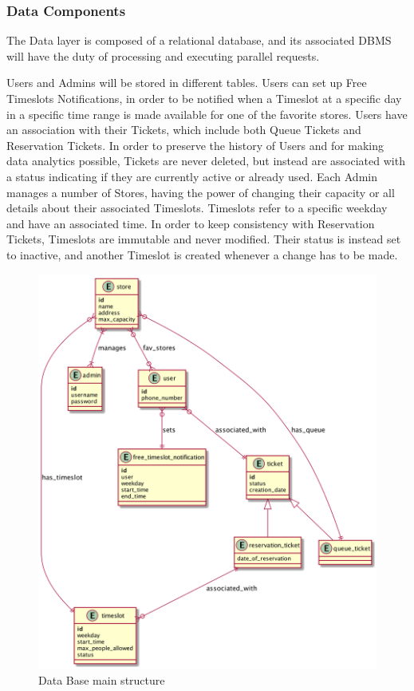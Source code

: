 \subsubsection{Data Components}
The Data layer is composed of a relational database, and its associated DBMS will have the duty of processing and executing parallel requests.

Users and Admins will be stored in different tables.
Users can set up Free Timeslots Notifications, in order to be notified when a Timeslot at a specific day in a specific time range is made available for one of the favorite stores.
Users have an association with their Tickets, which include both Queue Tickets and Reservation Tickets.
In order to preserve the history of Users and for making data analytics possible, Tickets are never deleted, but instead are associated with a status indicating if they are currently active or already used.
Each Admin manages a number of Stores, having the power of changing their capacity or all details about their associated Timeslots.
Timeslots refer to a specific weekday and have an associated time.
In order to keep consistency with Reservation Tickets, Timeslots are immutable and never modified. Their status is instead set to inactive, and another Timeslot is created whenever a change has to be made.


\begin{figure}[H]
    \includegraphics[width=\linewidth]{uml/db_structure.png}
    \caption{Data Base main structure}
    \label{fig:db_structure}
\end{figure}




